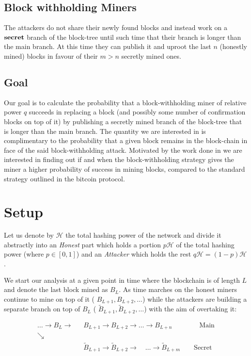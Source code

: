 \documentclass[letterpaper,12pt]{report}
\theoremstyle{plain}
\theoremstyle{definition}
\begin{document}
\subsection{Block withholding Miners}
The attackers do not share their newly found blocks and instead work on a $\bf{secret}$ branch of the block-tree until such time that their branch is longer than the main branch. At this time they can publish it and uproot the last $n$ (honestly mined) blocks in favour of their $m>n$ secretly mined ones.

\subsection{Goal}\label{subsec:goal}

Our goal is to calculate the probability that a block-withholding miner of relative power $q$ succeeds in replacing a block (and possibly some number of confirmation blocks on top of it) by publishing a secretly mined branch of the block-tree that is longer than the main branch.
The quantity we are interested in is complimentary to the probability that a given block remains in the block-chain in face of the said block-withholding attack.
Motivated by the work done in \cite{Selfish} we are interested in finding out if and when the block-withholding strategy gives the miner a higher probability of success in mining blocks, compared to the standard strategy outlined in the bitcoin protocol.


\section{Setup}\label{calcsetup}
Let us denote by $\mathcal{H}$ the total hashing power of the network and divide it abstractly into an \emph{Honest} part which holds a portion $p\mathcal{H}$ of the total hashing power (where $p \in [0,1]$) and an \emph{Attacker} which holds the rest $q\mathcal{H}=(1-p)\mathcal{H}$. 

We start our analysis at a given point in time where the blockchain is of length $L$ and denote the last block mined as $\mathit{B}_L$. As time marches on the honest miners continue to mine on top of it ( $\mathit{B}_{L+1}, \mathit{B}_{L+2}, \dots$) while the attackers are building a separate branch on top of $\mathit{B}_L$ ( $\mathit{\tilde{B}}_{L+1}, \mathit{\tilde{B}}_{L+2}, \dots$) with the aim of overtaking it:

\begin{eqnarray}\label{blockwithholdingchain}
 \dots \rightarrow \mathit{B}_L\rightarrow &\mathit{B}_{L+1}\rightarrow\mathit{B}_{L+2}
\rightarrow\dots\rightarrow\mathit{B}_{L+n} \qquad\qquad \mathrm{Main}\\\nonumber
\searrow & \\\nonumber
\qquad \qquad \qquad & \widetilde{\mathit{B}}_{L+1}\rightarrow\widetilde{\mathit{B}}_{L+2}
\longrightarrow \quad \dots \longrightarrow\widetilde{\mathit{B}}_{L+m}\qquad \mathrm{Secret}
\end{eqnarray}
\end{document}

